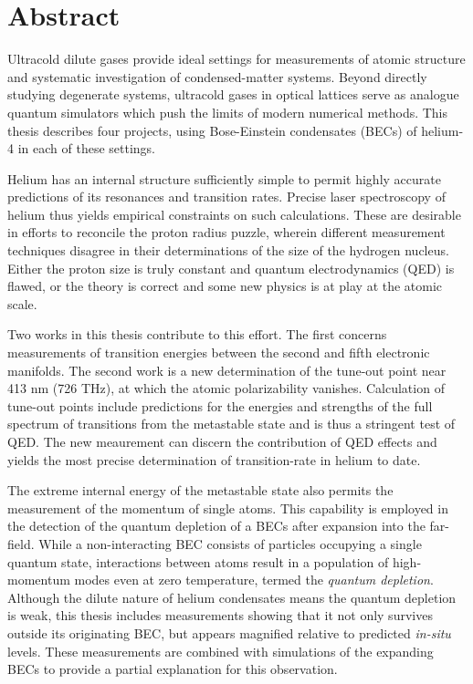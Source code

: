 \section*{Abstract}
Ultracold dilute gases provide ideal settings for measurements of atomic structure and systematic investigation of condensed-matter systems. Beyond directly studying degenerate systems, ultracold gases in optical lattices serve as analogue quantum simulators which push the limits of modern numerical methods. 
This thesis describes four projects, using Bose-Einstein condensates (BECs) of helium-4 in each of these settings.

Helium has an internal structure sufficiently simple to permit highly accurate predictions of its resonances and transition rates.
Precise laser spectroscopy of helium thus yields empirical constraints on such calculations.
These are desirable in efforts to reconcile the proton radius puzzle, wherein different measurement techniques disagree in their determinations of the size of the hydrogen nucleus.
Either the proton size is truly constant and quantum electrodynamics (QED) is flawed, or the theory is correct and some new physics is at play at the atomic scale.

Two works in this thesis contribute to this effort. 
The first concerns measurements of transition energies between the second and fifth electronic manifolds.
The second work is a new determination of the tune-out point near 413 nm (726 THz), at which the atomic polarizability vanishes. 
Calculation of tune-out points include predictions for the energies and strengths of the full spectrum of transitions from the metastable state and is thus a stringent test of QED.
The new meaurement can discern the contribution of QED effects and yields the most precise determination of transition-rate in helium to date.

The extreme internal energy of the metastable state also permits the measurement of the momentum of single atoms.
This capability is employed in the detection of the quantum depletion of a BECs after expansion into the far-field.
While a non-interacting BEC consists of particles occupying a single quantum state, interactions between atoms result in a population of high-momentum modes even at zero temperature, termed the \emph{quantum depletion}.
Although the dilute nature of helium condensates means the quantum depletion is weak, this thesis includes measurements showing that it not only survives outside its originating BEC, but appears magnified relative to predicted \emph{in-situ} levels.
These measurements are combined with simulations of the expanding BECs to provide a partial explanation for this observation.

